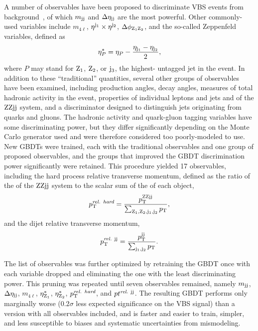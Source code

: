 A number of observables have been proposed to discriminate VBS events from background~\cite{Zeppenfeld:54.6680}, of which $m_{\mathrm{j}\mathrm{j}}$ and $\Delta\eta_{\mathrm{j}\mathrm{j}}$ are the most powerful.
Other commonly-used variables include $m_{4\ell}$, $\eta^{\mathrm{j}_1} \times \eta^{\mathrm{j}_2}$, $\Delta\phi_{\mathrm{Z}_1\mathrm{Z}_2}$, and the so-called Zeppenfeld variables, defined as
\begin{equation}
  \eta^\ast_P = \eta_P - \frac{\eta_{\mathrm{j}_1} - \eta_{\mathrm{j}_2}}{2},
\end{equation}
where $P$ may stand for $\mathrm{Z}_1$, $\mathrm{Z}_2$, or $\mathrm{j}_3$, the highest-{\pt} untagged jet in the event.
In addition to these ``traditional'' quantities, several other groups of observables have been examined, including production angles, decay angles, measures of total hadronic activity in the event, properties of individual leptons and jets and of the $\mathrm{Z}\mathrm{Z}\mathrm{j}\mathrm{j}$ system, and a discriminator designed to distinguish jets originating from quarks and gluons.
The hadronic activity and quark-gluon tagging variables have some discriminating power, but they differ significantly depending on the Monte Carlo generator used and were therefore considered too poorly-modeled to use.
New GBDTs were trained, each with the traditional observables and one group of proposed observables, and the groups that improved the GBDT discrimination power significantly were retained.
This procedure yielded 17 observables, including the hard process relative transverse momentum, defined as the ratio of the {\pt} of the $\mathrm{Z}\mathrm{Z}\mathrm{j}\mathrm{j}$ system to the scalar sum of the {\pt} of each object,
\begin{equation}
  p_\mathrm{T}^\textit{rel. hard} = \frac{p_\mathrm{T}^{\mathrm{Z}\mathrm{Z}\mathrm{j}\mathrm{j}}}{\sum_{\mathrm{Z}_1,\mathrm{Z}_2,\mathrm{j}_1,\mathrm{j}_2} p_\mathrm{T}},
\end{equation}
and the dijet relative transverse momentum,
\begin{equation}
  p_\mathrm{T}^{\textit{rel.}\ \mathrm{j}\mathrm{j}} = \frac{p_\mathrm{T}^{\mathrm{j}\mathrm{j}}}{\sum_{\mathrm{j}_1,\mathrm{j}_2} p_\mathrm{T}}.
\end{equation}

The list of observables was further optimized by retraining the GBDT once with each variable dropped and eliminating the one with the least discriminating power.
This pruning was repeated until seven observables remained, namely $m_{\mathrm{j}\mathrm{j}}$, $\Delta\eta_{\mathrm{j}\mathrm{j}}$, $m_{4\ell}$, $\eta^\ast_{\mathrm{Z}_1}$, $\eta^\ast_{\mathrm{Z}_2}$, $p_\mathrm{T}^\textit{rel. hard}$, and $pt^{\textit{rel.}\ \mathrm{j}\mathrm{j}}$.
The resulting GBDT performs only marginally worse ($0.2\sigma$ less expected significance on the VBS signal) than a version with all observables included, and is faster and easier to train, simpler, and less susceptible to biases and systematic uncertainties from mismodeling.

